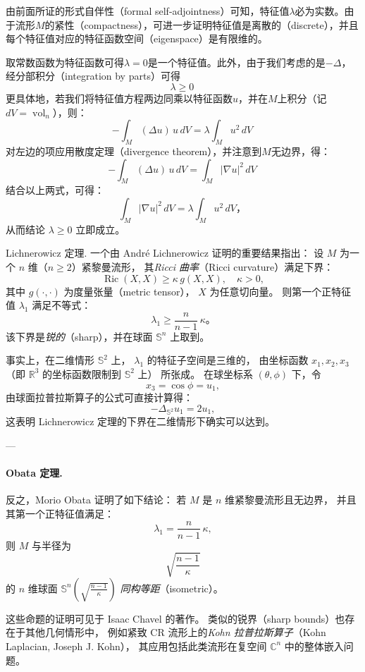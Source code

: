 由前面所证的形式自伴性（formal self-adjointness）可知，特征值$\lambda$必为实数。由于流形$M$的紧性（compactness），可进一步证明特征值是离散的（discrete），并且每个特征值对应的特征函数空间（eigenspace）是有限维的。

取常数函数为特征函数可得$\lambda = 0$是一个特征值。此外，由于我们考虑的是$-\Delta$，经分部积分（integration by parts）可得
\[
\lambda \ge 0~
\]
更具体地，若我们将特征值方程两边同乘以特征函数$u$，并在$M$上积分（记$dV = \operatorname{vol}_{n}$），则：
\[
-\int_{M} (\Delta u)\, u\, dV = \lambda \int_{M} u^{2}\, dV~
\]
对左边的项应用散度定理（divergence theorem），并注意到$M$无边界，得：
\[
-\int_{M} (\Delta u)\, u\, dV = \int_{M} |\nabla u|^{2}\, dV~
\]
结合以上两式，可得：
\[
\int_{M} |\nabla u|^{2}\, dV = \lambda \int_{M} u^{2}\, dV，~
\]
从而结论 $\lambda \ge 0$ 立即成立。

Lichnerowicz 定理.
一个由 André Lichnerowicz 证明的重要结果指出：
设 $M$ 为一个 $n$ 维（$n \ge 2$）紧黎曼流形，
其\emph{Ricci 曲率}（Ricci curvature）满足下界：
\[
\operatorname{Ric}(X, X) \ge \kappa\, g(X, X), \quad \kappa > 0,
\]
其中 $g(\cdot, \cdot)$ 为度量张量（metric tensor），
$X$ 为任意切向量。
则第一个正特征值 $\lambda_{1}$ 满足不等式：
\[
\lambda_{1} \ge \frac{n}{n-1}\, \kappa。
\]
该下界是\emph{锐的}（sharp），并在球面 $\mathbb{S}^{n}$ 上取到。

事实上，在二维情形 $\mathbb{S}^{2}$ 上，
$\lambda_{1}$ 的特征子空间是三维的，
由坐标函数 $x_{1}, x_{2}, x_{3}$（即 $\mathbb{R}^{3}$ 的坐标函数限制到 $\mathbb{S}^{2}$ 上）
所张成。
在球坐标系 $(\theta, \phi)$ 下，令
\[
x_{3} = \cos \phi = u_{1},
\]
由球面拉普拉斯算子的公式可直接计算得：
\[
-\Delta_{\mathbb{S}^{2}} u_{1} = 2u_{1},
\]
这表明 Lichnerowicz 定理的下界在二维情形下确实可以达到。

---

\paragraph{Obata 定理.}
反之，Morio Obata 证明了如下结论：
若 $M$ 是 $n$ 维紧黎曼流形且无边界，
并且其第一个正特征值满足：
\[
\lambda_{1} = \frac{n}{n-1}\, \kappa,
\]
则 $M$ 与半径为
\[
\sqrt{\frac{n-1}{\kappa}}
\]
的 $n$ 维球面 $\mathbb{S}^{n}\!\left(\sqrt{\frac{n-1}{\kappa}}\right)$ \emph{同构等距}（isometric）。

这些命题的证明可见于 Isaac Chavel 的著作。
类似的锐界（sharp bounds）也存在于其他几何情形中，
例如紧致 CR 流形上的\emph{Kohn 拉普拉斯算子}（Kohn Laplacian, Joseph J. Kohn），
其应用包括此类流形在复空间 $\mathbb{C}^{n}$ 中的整体嵌入问题。
